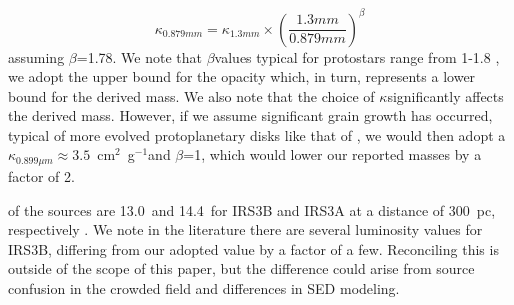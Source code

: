 \documentclass[twocolumn, 12pt, trackchanges]{aastex63}
\begin{document}
\begin{equation}
    \kappa_{0.879 mm} = \kappa_{1.3 mm}\times\left(\frac{1.3 mm}{0.879 mm}\right)^{\beta}
\end{equation}
assuming $\beta$=1.78. We note that $\beta$\space values typical for protostars range from 1-1.8 \citep{2009ApJ...696..841K, 2013PhDT.......434S}, we adopt the upper bound for the opacity which, in turn, represents a lower bound for the derived mass. We also note that the choice of $\kappa$\space significantly affects the derived mass.  However, if we assume significant grain growth has occurred, typical of more evolved protoplanetary disks like that of \citet{2009ApJ...700.1502A}, we would then adopt a $\kappa_{0.899\mu m}\approx3.5$~cm$^{2}$~g$^{-1}$\space and $\beta$=1, which would lower our reported masses by a factor of 2.

 of the sources are  13.0~\lsun\space and 14.4~\lsun\space for IRS3B and IRS3A at a distance of 300~pc, respectively \citep[8.3~\lsun\space and 9.2~\lsun\space for IRS3B and IRS3A, respectively at 230~pc; ][]{2016ApJ...818...73T}. We note  in the literature there are several luminosity values for IRS3B, differing from our adopted value by a factor of a few. Reconciling this is outside of the scope of this paper, but the difference could arise from source confusion in the crowded field and differences in SED modeling.
\end{document}
